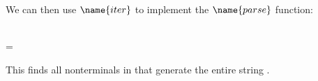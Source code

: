 
\noindent
We can then use $\name{iter}$ to implement the $\name{parse}$ function:

\begin{code}
   \isa \iso \tstring \to \iso \tgrammar \to \tset{\tsymbol}\\
   \> \> = \\
  \quad {}
\end{code}

\noindent
This finds all nonterminals in  that generate the entire string
. 


